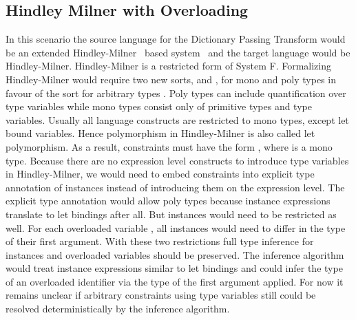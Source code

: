 \subsection{Hindley Milner with Overloading}\label{sec:hm}
In this scenario the source language for the Dictionary Passing Transform would be an extended Hindley-Milner~\cite{hm} based system \HMo\ and the target language would be Hindley-Milner. 
Hindley-Milner is a restricted form of System F. Formalizing Hindley-Milner would require two new sorts,  and , for mono and poly types in favour of the sort for arbitrary types . Poly types can include quantification over type variables while mono types consist only of primitive types and type variables. 
Usually all language constructs are restricted to mono types, except let bound variables. 
Hence polymorphism in Hindley-Milner is also called let polymorphism.  
As a result, constraints must have the form  \Constr{:} , where  is a mono type. 
Because there are no expression level constructs to introduce type variables in Hindley-Milner, we would need to embed constraints into explicit type annotation of instances instead of introducing them on the expression level. 
The explicit type annotation would allow poly types because instance expressions translate to let bindings after all.
But instances would need to be restricted as well. For each overloaded variable , all instances would need to differ in the type of their first argument.
With these two restrictions full type inference for instances and overloaded variables should be preserved.
The inference algorithm would treat instance expressions similar to let bindings and could infer the type of an overloaded identifier via the type of the first argument applied. For now it remains unclear if arbitrary constraints using type variables still could be resolved deterministically by the inference algorithm.

